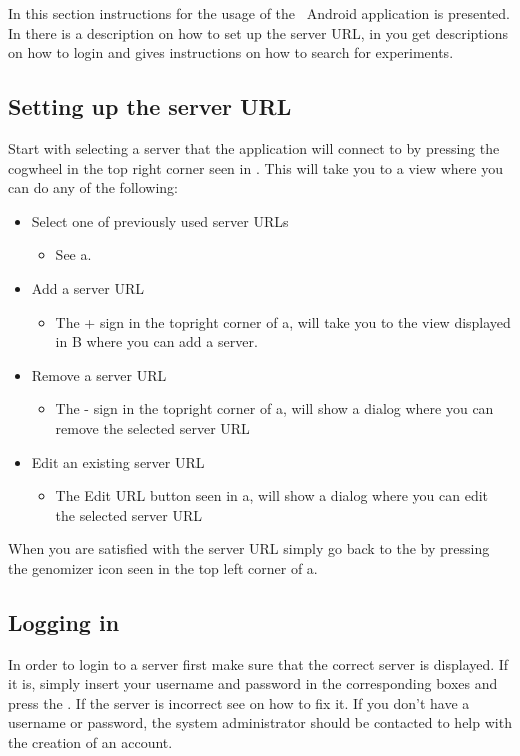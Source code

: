 In this section instructions for the usage of the \appName\ Android application is presented. In  there is a description on how to set up the server URL, in  you get descriptions on how to login and  gives instructions on how to search for experiments.

\subsection{Setting up the server URL}\label{sec:and_seturl}
Start with selecting a server that the application will connect to by pressing the cogwheel in the top right corner seen in . This will take you to a view where you can do any of the following:
\begin{itemize}
\item Select one of previously used server URLs 
	\begin{itemize}
	\item See a.
	\end{itemize}
\item Add a server URL 
	\begin{itemize}
	\item The + sign in the topright corner of a, will take you to the view displayed in  B where you can add a server.
	\end{itemize}
\item Remove a server URL
	\begin{itemize}
	\item The - sign in the topright corner of a, will show a dialog where you can remove the selected server URL
	\end{itemize}
\item Edit an existing server URL
\begin{itemize}
	\item The Edit URL button seen in a, will show a dialog where you can edit the selected server URL
	\end{itemize}
\end{itemize} 
When you are satisfied with the server URL simply go back to the  by pressing the genomizer icon seen in the top left corner of a.

\subsection{Logging in}\label{sec:and_login}
In order to login to a server first make sure that the correct server is displayed. If it is, simply insert your username and password in the corresponding boxes and press the . If the server is incorrect see  on how to fix it. If you don't have a username or password, the system administrator should be contacted to help with the creation of an account.

